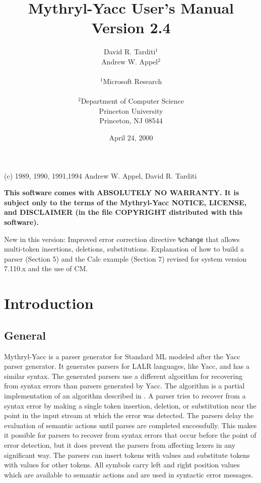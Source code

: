 \title{                        Mythryl-Yacc User's Manual \\
			       Version 2.4
      }
\author{                David R. Tarditi$^1$\\
                        Andrew W. Appel$^2$\\
\\              
$^1$Microsoft Research \\
\\
$^2$Department of Computer Science \\
    Princeton University \\
    Princeton, NJ 08544 
}
\date{April 24, 2000}


\maketitle
\begin{center}
(c) 1989, 1990, 1991,1994 Andrew W. Appel, David R. Tarditi
\end{center}

{\bf
This software comes with ABSOLUTELY NO WARRANTY.  It is subject only to
the terms of the Mythryl-Yacc NOTICE, LICENSE, and DISCLAIMER (in the
file COPYRIGHT distributed with this software).
}

New in this version:  Improved error correction directive \verb|%change|
that allows multi-token insertions, deletions, substitutions.
Explanation of how to build a parser (Section 5) and the Calc example
(Section 7) revised for system version 7.110.x and the use of CM.

\newpage
\tableofcontents
\newpage

\section{Introduction}
\subsection{General}
Mythryl-Yacc is a parser generator for Standard ML modeled after the
Yacc parser generator.  It generates parsers for LALR languages, like Yacc,
and has a similar syntax.  The generated parsers use a different algorithm 
for recovering from syntax errors than parsers generated by Yacc.  
The algorithm is a partial implementation of an algorithm described in \cite{bf}.
A parser tries to recover from a syntax error
by making a single token insertion, deletion, or
substitution near the point in the input stream at which the error
was detected.  The parsers delay the evaluation of semantic actions until
parses are completed successfully.  This makes it possible for
parsers to recover from syntax errors that occur before the point
of error detection, but it does prevent the parsers from
affecting lexers in any significant way.  The parsers
can insert tokens with values and substitute tokens with values
for other tokens. All symbols carry left and right position values
which are available to semantic actions and are used in
syntactic error messages.

